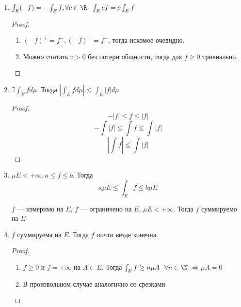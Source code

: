 \begin{prop}
\begin{enumerate}
        \item \(\int_E ( - f) = - \int_E f, \forall c\in\R \ \ \int_E cf = c\int_E f\)

              \begin{proof}\itemfix
                  \begin{enumerate}
                      \item \(( - f)^{ +} = f^{ -}, ( - f)^{ -} = f^{ +}\), тогда искомое очевидно.
                      \item Можно считать \(c > 0\) без потери общности, тогда для \(f \geq 0\) тривиально.
                  \end{enumerate}
              \end{proof}

        \item \(\exists \int_E f d\mu\). Тогда \(|\int_E f d\mu| \leq \int_E |f|d\mu\)

              \begin{proof}
                  \[ -|f| \leq f \leq |f|\]
                  \[ -\int |f| \leq \int f \leq \int |f|\]
                  \[ \left|\int f\right| \leq \int |f| \]
              \end{proof}

        \item \(\mu E < +\infty, a \leq f \leq b\). Тогда
              \[a\mu E \leq \int_E f \leq b\mu E\]

              \begin{corollary}
                  \(f\) --- измеримо на \(E\), \(f\) --- ограничено на \(E\), \(\mu E < +\infty\). Тогда \(f\) суммируемо на \(E\)
              \end{corollary}

        \item \(f\) суммируема на \(E\). Тогда \(f\) почти везде конечна.
              \begin{proof}\itemfix
                  \begin{enumerate}
                      \item \(f \geq 0\) и \(f = +\infty\) на \(A\subset E\). Тогда \(\int_E f \geq n \mu A \ \ \forall n\in\N\) \( \Rightarrow \mu A = 0\)
                      \item В произвольном случае аналогично со срезками.
                  \end{enumerate}
              \end{proof}
    \end{enumerate}
\end{prop}

